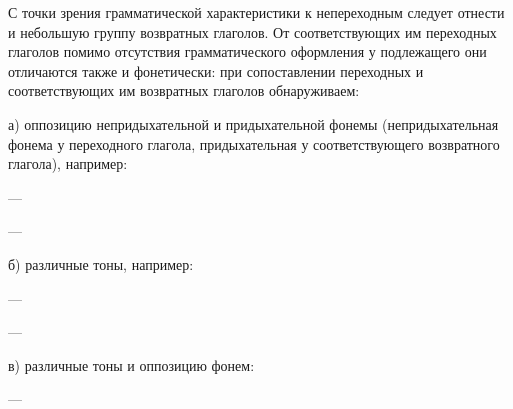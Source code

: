 С точки зрения грамматической характеристики к непереходным следует отнести и небольшую группу возвратных глаголов. От соответствующих им переходных глаголов помимо отсутствия грамматического оформления у подлежащего они отличаются также и фонетически: при сопоставлении переходных и соответствующих им возвратных глаголов обнаруживаем:

а) оппозицию непридыхательной и придыхательной фонемы (непридыхательная фонема у переходного глагола, придыхательная у соответствующего возвратного глагола), например:
\begin{prfsample}
	\item {} --- 
	\item {} --- 
\end{prfsample}

б) различные тоны, например:
\begin{prfsample}
	\item {} --- 
	\item {} --- 
\end{prfsample}

в) различные тоны и оппозицию фонем:
\begin{prfsample}
	\item {} --- 
\end{prfsample}

